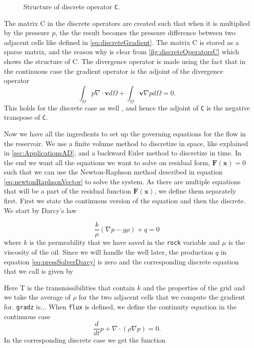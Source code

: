 \begin{figure}
    \caption{Structure of discrete operator \texttt{C}.}
    \label{fig:discreteOperatorsC}
\end{figure}
The matrix C in the discrete operators are created such that when it is multiplied by the pressure $p$, the the result becomes the pressure difference between two adjacent cells like defined in \eqref{eq:discreteGradient}. The matrix C is stored as a sparse matrix, and the reason why is clear from \autoref{fig:discreteOperatorsC} which shows the structure of C. The divergence operator is made using the fact that in the continuous case the gradient operator is the adjoint of the divergence operator
\begin{equation*}
    \int_\Omega p\nabla \cdot \textbf{v} d\Omega + \int_\Omega \textbf{v}\nabla p d\Omega = 0.
\end{equation*}
This holds for the discrete case as well \emph{\citep{lieMrstUrl}}, and hence the adjoint of \texttt{C} is the negative transpose of \texttt{C}.

Now we have all the ingredients to set up the governing equations for the flow in the reservoir. We use a finite volume method to discretize in space, like explained in \autoref{sec:ApplicationsAD}, and a backward Euler method to discretize in time. In the end we want all the equations we want to solve on residual form, $\boldsymbol{F}(\boldsymbol{x}) = 0$ such that we can use the Newton-Raphson method described in equation \eqref{eq:newtonRaphsonVector} to solve the system. As there are multiple equations that will be a part of the residual function $\boldsymbol{F}(\boldsymbol{x})$, we define them separately first. First we state the continuous version of the equation and then the discrete. We start by Darcy's law

\begin{equation*}
    \frac{k}{\mu}(\nabla p - g\rho) + q = 0
    \label{eq:pressSolverDarcy}
\end{equation*}
where $k$ is the permeability that we have saved in the \texttt{rock} variable and $\mu$ is the viscosity of the oil. Since we will handle the well later, the production $q$ in equation \eqref{eq:pressSolverDarcy} is zero and the corresponding discrete equation that we call  is given by 

Here T is the transmissibilities that contain $k$ and the properties of the grid and we take the average of $\rho$ for the two adjacent cells that we compute the gradient for. \texttt{gradz} is... When \texttt{flux} is defined, we define the continuity equation in the continuous case
\begin{equation*}
    \frac{d}{dt}p + \nabla\cdot(\rho\nabla p) = 0.
\end{equation*}
In the corresponding discrete case we get the function



